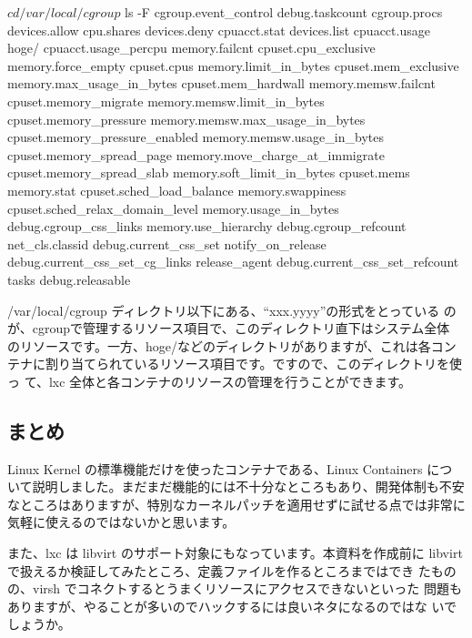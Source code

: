 \documentclass[mingoth,a4paper]{jsarticle}
\begin{document}
\begin{commandline}
$ cd /var/local/cgroup
$ ls -F
cgroup.event_control             debug.taskcount
cgroup.procs                     devices.allow
cpu.shares                       devices.deny
cpuacct.stat                     devices.list
cpuacct.usage                    hoge/
cpuacct.usage_percpu             memory.failcnt
cpuset.cpu_exclusive             memory.force_empty
cpuset.cpus                      memory.limit_in_bytes
cpuset.mem_exclusive             memory.max_usage_in_bytes
cpuset.mem_hardwall              memory.memsw.failcnt
cpuset.memory_migrate            memory.memsw.limit_in_bytes
cpuset.memory_pressure           memory.memsw.max_usage_in_bytes
cpuset.memory_pressure_enabled   memory.memsw.usage_in_bytes
cpuset.memory_spread_page        memory.move_charge_at_immigrate
cpuset.memory_spread_slab        memory.soft_limit_in_bytes
cpuset.mems                      memory.stat
cpuset.sched_load_balance        memory.swappiness
cpuset.sched_relax_domain_level  memory.usage_in_bytes
debug.cgroup_css_links           memory.use_hierarchy
debug.cgroup_refcount            net_cls.classid
debug.current_css_set            notify_on_release
debug.current_css_set_cg_links   release_agent
debug.current_css_set_refcount   tasks
debug.releasable
\end{commandline}

/var/local/cgroup ディレクトリ以下にある、``xxx.yyyy''の形式をとっている
のが、cgroupで管理するリソース項目で、このディレクトリ直下はシステム全体
のリソースです。一方、hoge/などのディレクトリがありますが、これは各コン
テナに割り当てられているリソース項目です。ですので、このディレクトリを使っ
て、lxc 全体と各コンテナのリソースの管理を行うことができます。

\subsection{まとめ}

Linux Kernel の標準機能だけを使ったコンテナである、Linux Containers につ
いて説明しました。まだまだ機能的には不十分なところもあり、開発体制も不安
なところはありますが、特別なカーネルパッチを適用せずに試せる点では非常に
気軽に使えるのではないかと思います。

また、lxc は libvirt のサポート対象にもなっています。本資料を作成前に
libvirt で扱えるか検証してみたところ、定義ファイルを作るところまではでき
たものの、virsh でコネクトするとうまくリソースにアクセスできないといった
問題もありますが、やることが多いのでハックするには良いネタになるのではな
いでしょうか。
\end{document}
